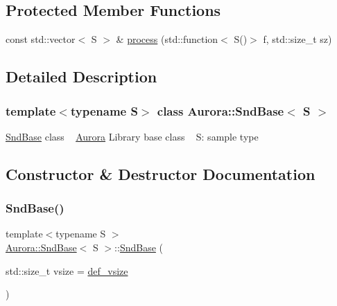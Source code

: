 \subsection*{Protected Member Functions}
\begin{DoxyCompactItemize}
\item 
const std\+::vector$<$ S $>$ \& \hyperlink{class_aurora_1_1_snd_base_a1601dc3f75fac1979d028bb7477d2544}{process} (std\+::function$<$ S()$>$ f, std\+::size\+\_\+t sz)
\end{DoxyCompactItemize}


\subsection{Detailed Description}
\subsubsection*{template$<$typename S$>$\newline
class Aurora\+::\+Snd\+Base$<$ S $>$}

\hyperlink{class_aurora_1_1_snd_base}{Snd\+Base} class ~\newline
\hyperlink{namespace_aurora}{Aurora} Library base class ~\newline
S\+: sample type 

\subsection{Constructor \& Destructor Documentation}
\mbox{\label{class_aurora_1_1_snd_base_a960739d3ae63df581c28f8801e589a3c}} 
\subsubsection{\texorpdfstring{Snd\+Base()}{SndBase()}}
{\footnotesize\ttfamily template$<$typename S $>$ \\
\hyperlink{class_aurora_1_1_snd_base}{Aurora\+::\+Snd\+Base}$<$ S $>$\+::\hyperlink{class_aurora_1_1_snd_base}{Snd\+Base} (\begin{DoxyParamCaption}\item[{std\+::size\+\_\+t}]{vsize = {\ttfamily \hyperlink{namespace_aurora_afaaddf667a06e7ce23c667a8b7295263}{def\+\_\+vsize}} }\end{DoxyParamCaption})\hspace{0.3cm}{\ttfamily [inline]}}

